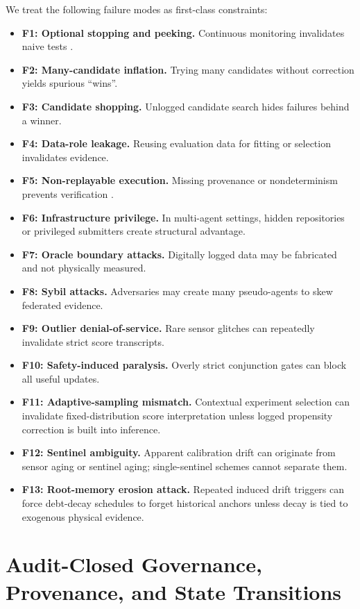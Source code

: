 \documentclass[11pt,a4paper]{article}
\begin{document}
We treat the following failure modes as first-class constraints:
\begin{itemize}[leftmargin=*,itemsep=2pt]
\item \textbf{F1: Optional stopping and peeking.} Continuous monitoring invalidates naive tests \citep{Johari2017Peeking,Johari2022AlwaysValid}.
\item \textbf{F2: Many-candidate inflation.} Trying many candidates without correction yields spurious ``wins''.
\item \textbf{F3: Candidate shopping.} Unlogged candidate search hides failures behind a winner.
\item \textbf{F4: Data-role leakage.} Reusing evaluation data for fitting or selection invalidates evidence.
\item \textbf{F5: Non-replayable execution.} Missing provenance or nondeterminism prevents verification \citep{Peng2011,Sandve2013}.
\item \textbf{F6: Infrastructure privilege.} In multi-agent settings, hidden repositories or privileged submitters create structural advantage.
\item \textbf{F7: Oracle boundary attacks.} Digitally logged data may be fabricated and not physically measured.
\item \textbf{F8: Sybil attacks.} Adversaries may create many pseudo-agents to skew federated evidence.
\item \textbf{F9: Outlier denial-of-service.} Rare sensor glitches can repeatedly invalidate strict score transcripts.
\item \textbf{F10: Safety-induced paralysis.} Overly strict conjunction gates can block all useful updates.
\item \textbf{F11: Adaptive-sampling mismatch.} Contextual experiment selection can invalidate fixed-distribution score interpretation unless logged propensity correction is built into inference.
\item \textbf{F12: Sentinel ambiguity.} Apparent calibration drift can originate from sensor aging or sentinel aging; single-sentinel schemes cannot separate them.
\item \textbf{F13: Root-memory erosion attack.} Repeated induced drift triggers can force debt-decay schedules to forget historical anchors unless decay is tied to exogenous physical evidence.
\end{itemize}

\section{Audit-Closed Governance, Provenance, and State Transitions}
\end{document}
